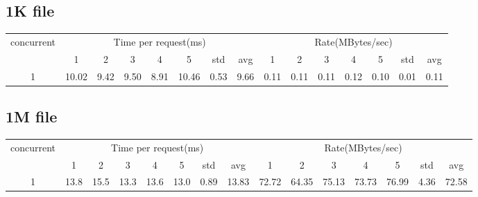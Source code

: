 \documentclass{article}
\begin{document}
\subsection*{1K file}
\begin{table}[H]
    \begin{tabular}{|c|c|c|c|c|c|c|c|c|c|c|c|c|c|c|}
        \hline
        \multirow{2}{*}{concurrent} & \multicolumn{7}{c|}{Time per request(ms)} & \multicolumn{7}{c|}{Rate(MBytes/sec)}                                                                                      \\ \cline{2-15}
                                    & 1                                         & 2                                     & 3    & 4    & 5     & std  & avg  & 1    & 2    & 3    & 4    & 5    & std  & avg  \\ \hline
        1                           & 10.02                                     & 9.42                                  & 9.50 & 8.91 & 10.46 & 0.53 & 9.66 & 0.11 & 0.11 & 0.11 & 0.12 & 0.10 & 0.01 & 0.11 \\ \hline
    \end{tabular}
\end{table}
\subsection*{1M file}
\begin{table}[H]
    \begin{tabular}{|c|c|c|c|c|c|c|c|c|c|c|c|c|c|c|}
        \hline
        \multirow{2}{*}{concurrent} & \multicolumn{7}{c|}{Time per request(ms)} & \multicolumn{7}{c|}{Rate(MBytes/sec)}                                                                                            \\ \cline{2-15}
                                    & 1                                         & 2                                     & 3    & 4    & 5    & std  & avg   & 1     & 2     & 3     & 4     & 5     & std  & avg   \\ \hline
        1                           & 13.8                                      & 15.5                                  & 13.3 & 13.6 & 13.0 & 0.89 & 13.83 & 72.72 & 64.35 & 75.13 & 73.73 & 76.99 & 4.36 & 72.58 \\ \hline
    \end{tabular}
\end{table}
\end{document}

